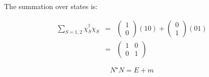 The summation over states is:

\begin{eqnarray*}
  \sum_{S = 1,2} \chi_S^{\dagger}\chi_S & = &
  \left(
    \begin{array}{c}
    1 \\
    0
    \end{array}
  \right)
  \left(1 0\right)
  +
  \left(
    \begin{array}{c}
    0 \\
    1
    \end{array}
  \right)
  \left(0 1\right)
  \\
  & = &
  \left(
    \begin{array}{cc}
    1 & 0 \\
    0 & 1
    \end{array}
  \right)
\end{eqnarray*}

\[
  N^{\star}N = E + m
\]

